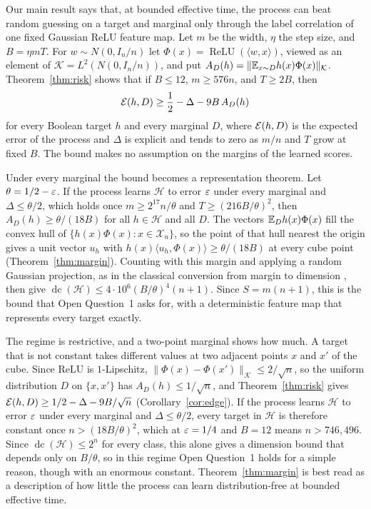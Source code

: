 \documentclass[11pt,letterpaper,pmlr,twoside]{jmlr}
\newcommand{\X}{\mathcal X}\newcommand{\Hc}{\mathcal H}
\newcommand{\Kc}{\mathcal K}\newcommand{\sgn}{\operatorname{sign}}
\newcommand{\relu}{\operatorname{ReLU}}\newcommand{\dc}{\operatorname{dc}}
\newcommand{\ip}[2]{\langle #1,#2\rangle}\newcommand{\norm}[1]{\lVert #1\rVert}
\begin{document}
Our main result says that, at bounded effective time, the process can beat random guessing on a target and marginal only through the label correlation of one fixed Gaussian ReLU feature map. Let $m$ be the width, $\eta$ the step size, and $B=\eta mT$. For $w\sim N(0,I_n/n)$ let $\Phi(x)=\relu(\ip wx)$, viewed as an element of $\Kc=L^2(N(0,I_n/n))$, and put $A_D(h)=\norm{\E_{x\sim D}h(x)\Phi(x)}_{\Kc}$. Theorem~\ref{thm:risk} shows that if $B\le12$, $m\ge576n$, and $T\ge2B$, then
\begin{equation}
 \mathcal E(h,D)\ge\frac12-\Delta-9B\,A_D(h)
 \label{eq:intro}
\end{equation}
for every Boolean target $h$ and every marginal $D$, where $\mathcal E(h,D)$ is the expected error of the process and $\Delta$ is explicit and tends to zero as $m/n$ and $T$ grow at fixed $B$. The bound makes no assumption on the margins of the learned scores.

Under every marginal the bound becomes a representation theorem. Let $\theta=1/2-\varepsilon$. If the process learns $\Hc$ to error $\varepsilon$ under every marginal and $\Delta\le\theta/2$, which holds once $m\ge2^{17}n/\theta$ and $T\ge(216B/\theta)^2$, then $A_D(h)\ge\theta/(18B)$ for all $h\in\Hc$ and all $D$. The vectors $\mathbb E_Dh(x)\Phi(x)$ fill the convex hull of $\{h(x)\Phi(x):x\in\X_n\}$, so the point of that hull nearest the origin gives a unit vector $u_h$ with $h(x)\ip{u_h}{\Phi(x)}\ge\theta/(18B)$ at every cube point (Theorem~\ref{thm:margin}). Counting with this margin and applying a random Gaussian projection, as in the classical conversion from margin to dimension \citep{BES02,KMS20}, then give $\dc(\Hc)\le4\cdot10^6(B/\theta)^4(n+1)$. Since $S=m(n+1)$, this is the bound that Open Question~1 asks for, with a deterministic feature map that represents every target exactly.

The regime is restrictive, and a two-point marginal shows how much. A target that is not constant takes different values at two adjacent points $x$ and $x'$ of the cube. Since ReLU is $1$-Lipschitz, $\norm{\Phi(x)-\Phi(x')}_{\Kc}\le2/\sqrt n$, so the uniform distribution $D$ on $\{x,x'\}$ has $A_D(h)\le1/\sqrt n$, and Theorem~\ref{thm:risk} gives $\mathcal E(h,D)\ge1/2-\Delta-9B/\sqrt n$ (Corollary~\ref{cor:edge}). If the process learns $\Hc$ to error $\varepsilon$ under every marginal and $\Delta\le\theta/2$, every target in $\Hc$ is therefore constant once $n>(18B/\theta)^2$, which at $\varepsilon=1/4$ and $B=12$ means $n>746{,}496$. Since $\dc(\Hc)\le2^n$ for every class, this alone gives a dimension bound that depends only on $B/\theta$, so in this regime Open Question~1 holds for a simple reason, though with an enormous constant. Theorem~\ref{thm:margin} is best read as a description of how little the process can learn distribution-free at bounded effective time.
\end{document}
